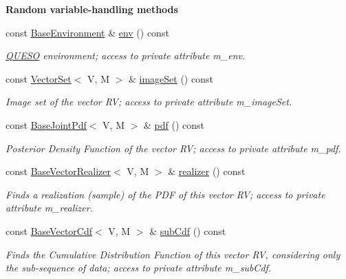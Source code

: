 \begin{Indent}{\bf Random variable-\/handling methods}\par
\begin{DoxyCompactItemize}
\item 
const \hyperlink{class_q_u_e_s_o_1_1_base_environment}{Base\-Environment} \& \hyperlink{class_q_u_e_s_o_1_1_base_vector_r_v_ad5bf8486b3bacb46b9d4ecba513fd37b}{env} () const 
\begin{DoxyCompactList}\small\item\em \hyperlink{namespace_q_u_e_s_o}{Q\-U\-E\-S\-O} environment; access to private attribute m\-\_\-env. \end{DoxyCompactList}\item 
const \hyperlink{class_q_u_e_s_o_1_1_vector_set}{Vector\-Set}$<$ V, M $>$ \& \hyperlink{class_q_u_e_s_o_1_1_base_vector_r_v_aa4dd2f036228eac1f945bacc7147a922}{image\-Set} () const 
\begin{DoxyCompactList}\small\item\em Image set of the vector R\-V; access to private attribute m\-\_\-image\-Set. \end{DoxyCompactList}\item 
const \hyperlink{class_q_u_e_s_o_1_1_base_joint_pdf}{Base\-Joint\-Pdf}$<$ V, M $>$ \& \hyperlink{class_q_u_e_s_o_1_1_base_vector_r_v_a3206740e05e0c64a88273029e963b185}{pdf} () const 
\begin{DoxyCompactList}\small\item\em Posterior Density Function of the vector R\-V; access to private attribute m\-\_\-pdf. \end{DoxyCompactList}\item 
const \hyperlink{class_q_u_e_s_o_1_1_base_vector_realizer}{Base\-Vector\-Realizer}$<$ V, M $>$ \& \hyperlink{class_q_u_e_s_o_1_1_base_vector_r_v_aea4b01eef0baf36944d14459a7b9ccf4}{realizer} () const 
\begin{DoxyCompactList}\small\item\em Finds a realization (sample) of the P\-D\-F of this vector R\-V; access to private attribute m\-\_\-realizer. \end{DoxyCompactList}\item 
const \hyperlink{class_q_u_e_s_o_1_1_base_vector_cdf}{Base\-Vector\-Cdf}$<$ V, M $>$ \& \hyperlink{class_q_u_e_s_o_1_1_base_vector_r_v_a905586dc1529a3ae7dd7f04313ca9e8a}{sub\-Cdf} () const 
\begin{DoxyCompactList}\small\item\em Finds the Cumulative Distribution Function of this vector R\-V, considering only the sub-\/sequence of data; access to private attribute m\-\_\-sub\-Cdf. \end{DoxyCompactList}\item 

\end{DoxyCompactItemize}
\end{Indent}

